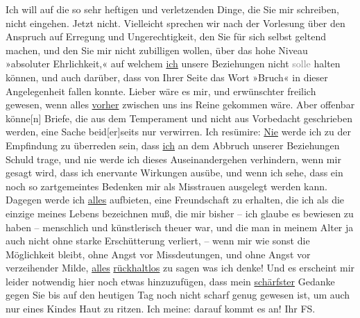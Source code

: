 \pstart
           Ich will auf die so sehr heftigen und verletzenden Dinge, die Sie mir schreiben,
               nicht eingehen. Jetzt nicht. Vielleicht sprechen wir nach der Vorlesung über den
               Anspruch auf Erregung und Ungerechtigkeit, den Sie für sich selbst geltend machen,
               und den Sie mir nicht zubilligen wollen, über das hohe Niveau »absoluter
               Ehrlichkeit,« auf welchem \uline{ich} unsere Beziehungen
               nicht \textcolor{gray}{solle} halten können, und auch darüber, dass von Ihrer Seite
               das Wort »Bruch« in dieser Angelegenheit fallen konnte. Lieber wäre es mir, und
               erwünschter freilich gewesen, wenn alles \uline{vorher}
               zwischen uns ins Reine gekommen wäre. Aber offenbar könne{[}n{]}
               Briefe, die aus dem Temperament und nicht aus Vorbedacht geschrieben werden, eine
               Sache beid{[}er{]}seits nur verwirren. Ich resümire: \uline{Nie} werde ich {\pb}zu der Empfindung zu überreden
               sein, dass \uline{ich} an dem Abbruch unserer Beziehungen
               Schuld trage, und nie werde ich dieses Auseinandergehen verhindern, wenn mir gesagt
               wird, dass ich enervante Wirkungen ausübe, und wenn ich sehe, dass ein noch so
               zartgemeintes Bedenken mir als Misstrauen ausgelegt werden kann. Dagegen werde ich
                  \uline{alles} aufbieten, eine Freundschaft zu erhalten,
               die ich als die einzige meines Lebens bezeichnen muß, die mir bisher – ich glaube es
               bewiesen zu haben – menschlich und künstlerisch theuer war, und die man in meinem
               Alter ja auch nicht ohne starke Erschütterung verliert, – wenn mir wie sonst die
               Möglichkeit bleibt, ohne Angst vor Missdeutungen, und ohne Angst vor verzeihender
               Milde, \uline{alles}{ }\uline{rückhaltlos} zu sagen was ich denke! Und es erscheint
               mir leider notwendig hier noch etwas hinzuzufügen, dass mein \uline{schärfster} Gedanke \introOben{}gegen Sie\introOben{} bis auf den
               heutigen Tag noch nicht scharf genug gewesen ist, um auch nur eines Kindes Haut zu
               ritzen. Ich meine: darauf kommt es an!\pend
           \pstart Ihr \spacefill\mbox{FS.}\pend{}\endnumbering{}  
      